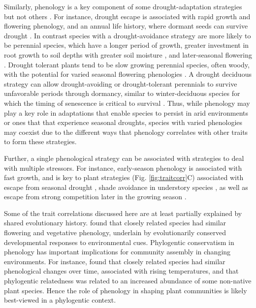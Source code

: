\documentclass[11pt]{article}
\newcommand{\R}[1]{\label{}\linelabel{#1}}
\begin{document}
Similarly, phenology is a key component of some drought-adaptation strategies but not others \citep{kooyers2015evolution}. For instance, drought escape is associated with rapid growth and flowering phenology, and an annual life history, where dormant seeds can survive drought \citep{fox1992evolution}. In contrast species with a drought-avoidance strategy are more likely to be perennial species, which have a longer period of growth, greater investment in root growth to soil depths with greater soil moisture \citep{padilla2007rooting}, and later-seasonal flowering \citep{seabloom2003invasion}. Drought tolerant plants tend to be slow growing perennial species, often woody, with the potential for varied seasonal flowering phenologies \citep{williams1997leaf}.  A drought deciduous strategy can allow drought-avoiding or drought-tolerant perennials to survive unfavorable periods through dormancy, similar to winter-deciduous species for which the timing of senescence is critical to survival \citep{gillespie2017winter}. Thus, while phenology may play a key role in adaptations that enable species to persist in arid environments or ones that that experience seasonal droughts, species with varied phenologies may coexist due to the different ways that phenology correlates with other traits to form these strategies.

Further, a single phenological strategy can be associated with strategies to deal with multiple stressors.  For instance, early-season phenology is associated with fast growth, and is key to plant strategies (Fig. \ref{fig:traitcorr}C) associated with escape from seasonal drought \citep{blumenthal2020traits}, shade avoidance in understory species \citep{augspurger2005light}, as well as escape from strong competition later in the growing season \citep{gioria2014resource, godoy2014}.

\R{phylo1} Some of the trait correlations discussed here are at least partially explained by shared evolutionary history. \citet{davies2013} found that closely related species had similar flowering and vegetative phenology, underlain by evolutionarily conserved developmental responses to environmental cues. Phylogentic conservatism in phenology has important implications for community assembly in changing environments. For instance, \citet{davis2010importance} found that closely related species had similar phenological changes over time, associated with rising temperatures, and that phylogentic relatedness was related to an increased abundance of some non-native plant species. Hence the role of phenology in shaping plant communities is likely best-viewed in a phylogentic context. \R{phylo2} %
\end{document}
